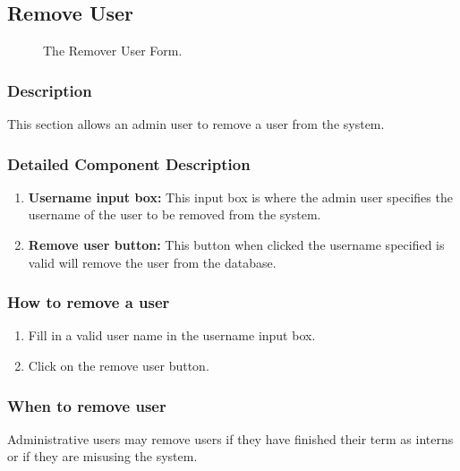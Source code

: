 \documentclass[14pt, a4paper]{article}
\begin{document}
\subsection{Remove User}

	\begin{figure}[H]
		\centerline{}
		\caption{The Remover User Form.}
		\label{fig:removeUser1}
	\end{figure}
	\subsubsection{Description} This section allows an admin user to remove a user from the system.
	\subsubsection{Detailed Component Description}
		\begin{enumerate}
			\item \textbf{Username input box:} This input box is where the admin user specifies the username of the user to be removed from the system.
			\item \textbf{Remove user button:} This button when clicked the username specified is valid will remove the user from the database.
		\end{enumerate}
	\subsubsection{How to remove a user}
		\begin{enumerate}
			\item Fill in a valid user name in the username input box.
			\item Click on the remove user button.
		\end{enumerate}
	\subsubsection{When to remove user}
	Administrative users may remove users if they have finished their term as interns or if they are misusing the system.
	
\end{document}
